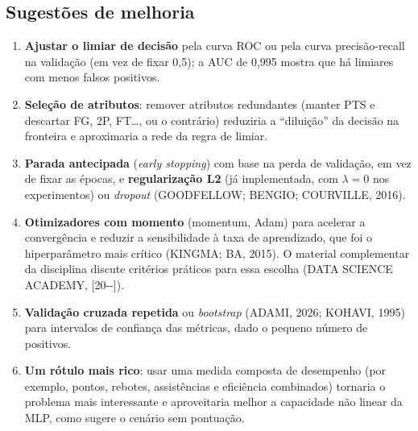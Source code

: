 \documentclass[11pt,a4paper]{article}
\begin{document}
\subsection{Sugestões de melhoria}
\begin{enumerate}
  \item \textbf{Ajustar o limiar de decisão} pela curva ROC ou pela curva precisão-recall na validação
        (em vez de fixar 0,5); a AUC de 0,995 mostra que há limiares com menos falsos positivos.
  \item \textbf{Seleção de atributos}: remover atributos redundantes (manter PTS e descartar FG, 2P, FT\ldots, ou o
        contrário) reduziria a ``diluição'' da decisão na fronteira e aproximaria a rede da regra de limiar.
  \item \textbf{Parada antecipada} (\emph{early stopping}) com base na perda de validação, em vez de fixar as épocas,
        e \textbf{regularização L2} (já implementada, com $\lambda = 0$ nos experimentos) ou \emph{dropout}
        (GOODFELLOW; BENGIO; COURVILLE, 2016).
  \item \textbf{Otimizadores com momento} (momentum, Adam) para acelerar a convergência e reduzir a sensibilidade
        à taxa de aprendizado, que foi o hiperparâmetro mais crítico (KINGMA; BA, 2015). O material complementar
        da disciplina discute critérios práticos para essa escolha (DATA SCIENCE ACADEMY, [20-{}-]).
  \item \textbf{Validação cruzada repetida} ou \emph{bootstrap} (ADAMI, 2026; KOHAVI, 1995) para intervalos de confiança das métricas,
        dado o pequeno número de positivos.
  \item \textbf{Um rótulo mais rico}: usar uma medida composta de desempenho (por exemplo, pontos, rebotes,
        assistências e eficiência combinados) tornaria o problema mais interessante e aproveitaria melhor a
        capacidade não linear da MLP, como sugere o cenário sem pontuação.
\end{enumerate}
\end{document}
